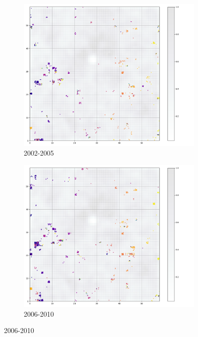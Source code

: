 \begin{figure}
     \centering
     \begin{subfigure}[b]{0.45\textwidth}
         \centering
         \includegraphics[width=\textwidth]{figures/NFLX_0205.png}
         \caption{2002-2005}
     \end{subfigure}
     \hfill
     \begin{subfigure}[b]{0.45\textwidth}
         \centering
         \includegraphics[width=\textwidth]{figures/NFLX_0510.png}
         \caption{2006-2010}
     \end{subfigure}

\end{figure}
